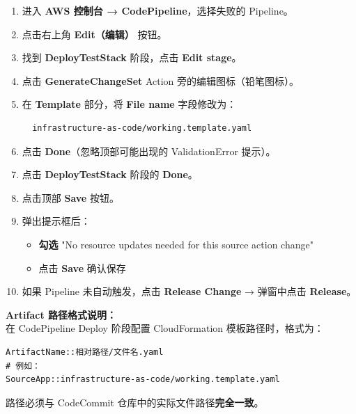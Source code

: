 \documentclass[12pt, a4paper]{article}
\begin{document}
\vspace{0.5cm}

\begin{enumerate}[leftmargin=2em, label=\textbf{Step \arabic*.}]

  \item 进入 \textbf{AWS 控制台 → CodePipeline}，选择失败的 Pipeline。

  \item 点击右上角 \textbf{Edit（编辑）} 按钮。

  \item 找到 \textbf{DeployTestStack} 阶段，点击 \textbf{Edit stage}。

  \item 点击 \textbf{GenerateChangeSet} Action 旁的编辑图标（铅笔图标）。

  \item 在 \textbf{Template} 部分，将 \textbf{File name} 字段修改为：
  \begin{lstlisting}
  infrastructure-as-code/working.template.yaml
  \end{lstlisting}

  \item 点击 \textbf{Done}（忽略顶部可能出现的 ValidationError 提示）。

  \item 点击 \textbf{DeployTestStack} 阶段的 \textbf{Done}。

  \item 点击顶部 \textbf{Save} 按钮。

  \item 弹出提示框后：
  \begin{itemize}
    \item \textbf{勾选} "No resource updates needed for this source action change"
    \item 点击 \textbf{Save} 确认保存
  \end{itemize}

  \item 如果 Pipeline 未自动触发，点击 \textbf{Release Change} → 弹窗中点击 \textbf{Release}。

\end{enumerate}

\vspace{0.5cm}

\begin{notebox}
\textbf{Artifact 路径格式说明：}\\
在 CodePipeline Deploy 阶段配置 CloudFormation 模板路径时，格式为：
\begin{lstlisting}
ArtifactName::相对路径/文件名.yaml
# 例如：
SourceApp::infrastructure-as-code/working.template.yaml
\end{lstlisting}
路径必须与 CodeCommit 仓库中的实际文件路径\textbf{完全一致}。
\end{notebox}
\end{document}
